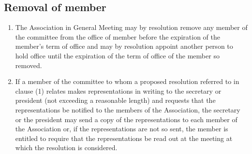 \documentclass{article}
\begin{document}
\subsection{Removal of member}
\begin{enumerate}
  \item The Association in General Meeting may by resolution remove any member of the committee from the office of member before the expiration of the member’s term of office and may by resolution appoint another person to hold office until the expiration of the term of office of the member so removed.
  \item If a member of the committee to whom a proposed resolution referred to in clause (1) relates makes representations in writing to the secretary or president (not exceeding a reasonable length) and requests that the representations be notified to the members of the Association, the secretary or the president may send a copy of the representations to each member of the Association or, if the representations are not so sent, the member is entitled to require that the representations be read out at the meeting at which the resolution is considered.
\end{enumerate}
\end{document}
